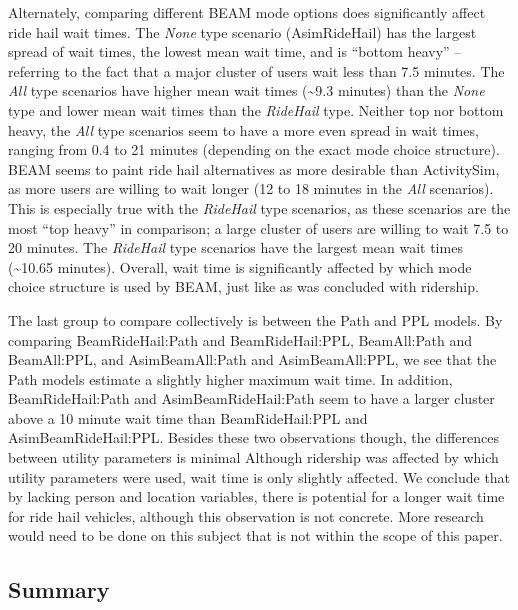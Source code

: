 \documentclass[fancy, masters]{byuthesis}
\begin{document}
Alternately, comparing different BEAM mode options does significantly affect ride hail wait times. The \emph{None} type scenario (AsimRideHail) has the largest spread of wait times, the lowest mean wait time, and is ``bottom heavy'' -- referring to the fact that a major cluster of users wait less than 7.5 minutes. The \emph{All} type scenarios have higher mean wait times (\textasciitilde9.3 minutes) than the \emph{None} type and lower mean wait times than the \emph{RideHail} type. Neither top nor bottom heavy, the \emph{All} type scenarios seem to have a more even spread in wait times, ranging from 0.4 to 21 minutes (depending on the exact mode choice structure). BEAM seems to paint ride hail alternatives as more desirable than ActivitySim, as more users are willing to wait longer (12 to 18 minutes in the \emph{All} scenarios). This is especially true with the \emph{RideHail} type scenarios, as these scenarios are the most ``top heavy'' in comparison; a large cluster of users are willing to wait 7.5 to 20 minutes. The \emph{RideHail} type scenarios have the largest mean wait times (\textasciitilde10.65 minutes). Overall, wait time is significantly affected by which mode choice structure is used by BEAM, just like as was concluded with ridership.

The last group to compare collectively is between the Path and PPL models. By comparing BeamRideHail:Path and BeamRideHail:PPL, BeamAll:Path and BeamAll:PPL, and AsimBeamAll:Path and AsimBeamAll:PPL, we see that the Path models estimate a slightly higher maximum wait time. In addition, BeamRideHail:Path and AsimBeamRideHail:Path seem to have a larger cluster above a 10 minute wait time than BeamRideHail:PPL and AsimBeamRideHail:PPL. Besides these two observations though, the differences between utility parameters is minimal Although ridership was affected by which utility parameters were used, wait time is only slightly affected. We conclude that by lacking person and location variables, there is potential for a longer wait time for ride hail vehicles, although this observation is not concrete. More research would need to be done on this subject that is not within the scope of this paper.

\hypertarget{summary-1}{%
\subsection{Summary}\label{summary-1}}
\end{document}
